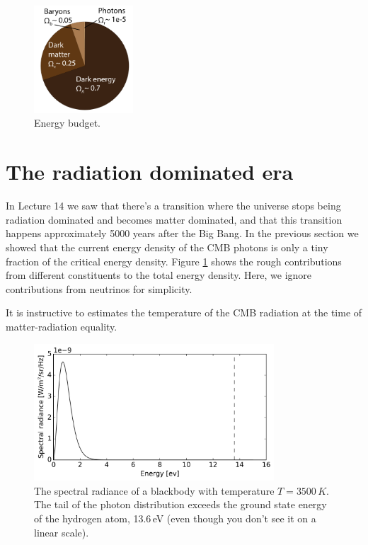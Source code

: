 \documentclass[a4paper,12pt]{article}
\theoremstyle{remark}
\newcommand{\mrm}[1]{\mathrm{#1}}
\renewcommand{\=}[1]{\stackrel{#1}{=}} %
\theoremstyle{plain}
\theoremstyle{definition}
\begin{document}
\vspace{-10mm}
\begin{figure}
\begin{center}
    \vspace{-10mm}
    \includegraphics*[angle=0,width=0.33\textwidth]{img/pie_chart.png}
    \caption[Energy budget]{Energy budget.}
\label{fig:eb}
\end{center}
\end{figure}

\section{The radiation dominated era}
In Lecture 14 we saw that there's a transition where the universe stops being radiation dominated and becomes matter dominated, and that this transition happens approximately 5000 years after the Big Bang. In the previous section we showed that the current energy density of the CMB photons is only a tiny fraction of the critical energy density. Figure \ref{fig:eb} shows the rough contributions from different constituents to the total energy density. Here, we ignore contributions from neutrinos for simplicity.

It is instructive to estimates the temperature of the CMB radiation at the time of matter-radiation equality. 

\begin{figure}[t]
\begin{center}
    \includegraphics*[angle=0,width=0.8\textwidth]{img/blackbody.png}
    \caption[The blackbody spectrum]{The spectral radiance of a blackbody with temperature $T = 3500\,K$. The tail of the photon distribution exceeds the ground state energy of the hydrogen atom, 13.6\,eV (even though you don't see it on a linear scale).}
\label{fig:blackbody}
\end{center}
\end{figure}
\end{document}
